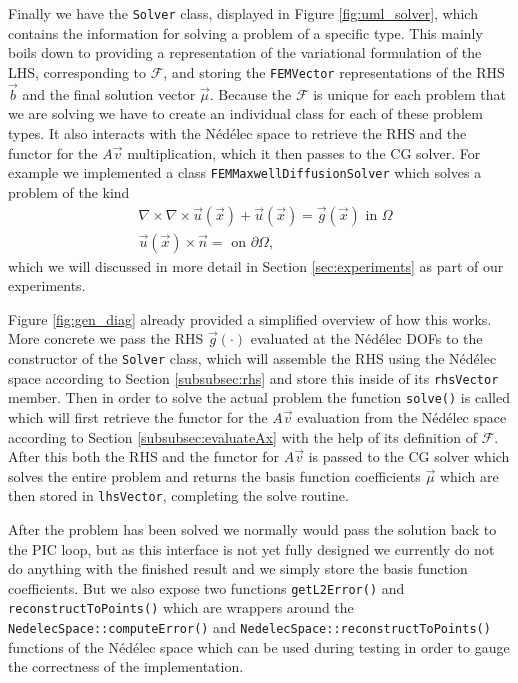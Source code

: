 Finally we have the \texttt{Solver} class, displayed in Figure \ref{fig:uml_solver}, which contains the information for solving a problem of a specific type. This mainly boils down to providing a representation of the variational formulation of the LHS, corresponding to \(\mathcal{F}\), and storing the \texttt{FEMVector} representations of the RHS \(\vec{b}\) and the final solution vector \(\vec\mu\). Because the \(\mathcal{F}\) is unique for each problem that we are solving we have to create an individual class for each of these problem types. It also interacts with the Nédélec space to retrieve the RHS and the functor for the \(A\vec{v}\) multiplication, which it then passes to the CG solver. For example we implemented a class \texttt{FEMMaxwellDiffusionSolver} which solves a problem of the kind
\begin{align}
    &\nabla \times \nabla \times \vec{u}(\vec{x}) + \vec{u}(\vec{x}) = \vec{g}(\vec{x}) \text{ in } \Omega\\
    &\vec{u}(\vec{x}) \times \vec n =  \text{ on } \partial \Omega\text{,}
\end{align}
which we will discussed in more detail in Section \ref{sec:experiments} as part of our experiments.

Figure \ref{fig:gen_diag} already provided a simplified overview of how this works. More concrete we pass the RHS \(\vec{g}(\cdot)\) evaluated at the Nédélec DOFs to the constructor of the \texttt{Solver} class, which will assemble the RHS using the Nédélec space according to Section \ref{subsubsec:rhs} and store this inside of its \texttt{rhsVector} member. Then in order to solve the actual problem the function \texttt{solve()} is called which will first retrieve the functor for the \(A\vec{v}\) evaluation from the Nédélec space according to Section \ref{subsubsec:evaluateAx} with the help of its definition of \(\mathcal{F}\). After this both the RHS and the functor for \(A\vec{v}\) is passed to the CG solver which solves the entire problem and returns the basis function coefficients \(\vec{\mu}\) which are then stored in \texttt{lhsVector}, completing the solve routine.\medskip

After the problem has been solved we normally would pass the solution back to the PIC loop, but as this interface is not yet fully designed we currently do not do anything with the finished result and we simply store the basis function coefficients. But we also expose two functions \texttt{getL2Error()} and \texttt{reconstructToPoints()} which are wrappers around the \texttt{NedelecSpace::computeError()} and \texttt{NedelecSpace::reconstructToPoints()} functions of the Nédélec space which can be used during testing in order to gauge the correctness of the implementation.